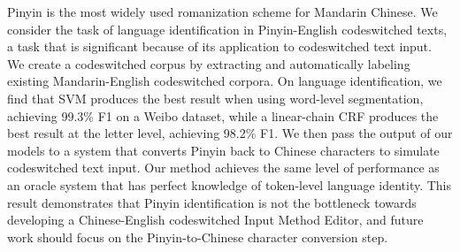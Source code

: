 Pinyin is the most widely used romanization scheme for Mandarin Chinese. We consider the task of language identification in Pinyin-English codeswitched texts, a task that is significant because of its application to codeswitched text input. We create a codeswitched corpus by extracting and automatically labeling existing Mandarin-English codeswitched corpora. On language identification, we find that SVM produces the best result when using word-level segmentation, achieving 99.3\% F1 on a Weibo dataset, while a linear-chain CRF produces the best result at the letter level, achieving 98.2\% F1. We then pass the output of our models to a system that converts Pinyin back to Chinese characters to simulate codeswitched text input. Our method achieves the same level of performance as an oracle system that has perfect knowledge of token-level language identity. This result demonstrates that Pinyin identification is not the bottleneck towards developing a Chinese-English codeswitched Input Method Editor, and future work should focus on the Pinyin-to-Chinese character conversion step.
